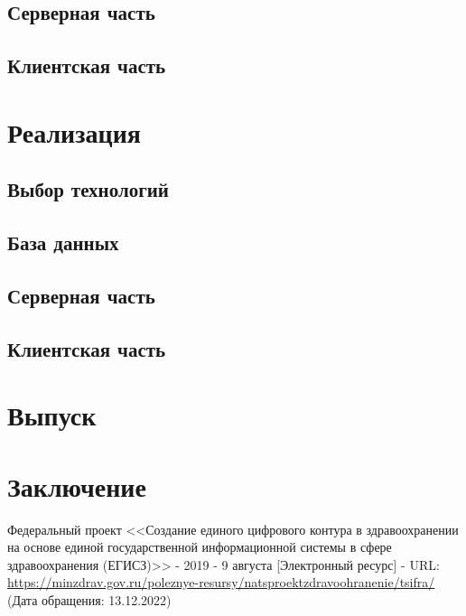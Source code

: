 \documentclass[a4paper,article]{article}
\begin{document}
    \subsection{Серверная часть}

    \subsection{Клиентская часть}

    \newpage

    \section{Реализация}

    \subsection{Выбор технологий}

    \subsection{База данных}

    \subsection{Серверная часть}

    \subsection{Клиентская часть}

    \newpage

    \section{Выпуск}

    \newpage

    \section*{Заключение}

    \newpage


    \begin{thebibliography}{}
         Федеральный проект <<Создание единого цифрового контура в здравоохранении на основе единой государственной информационной системы в сфере здравоохранения (ЕГИСЗ)>> - 2019 - 9 августа [Электронный ресурс] - URL: \url{https://minzdrav.gov.ru/poleznye-resursy/natsproektzdravoohranenie/tsifra/} (Дата обращения: 13.12.2022)
    \end{thebibliography}
\end{document}
